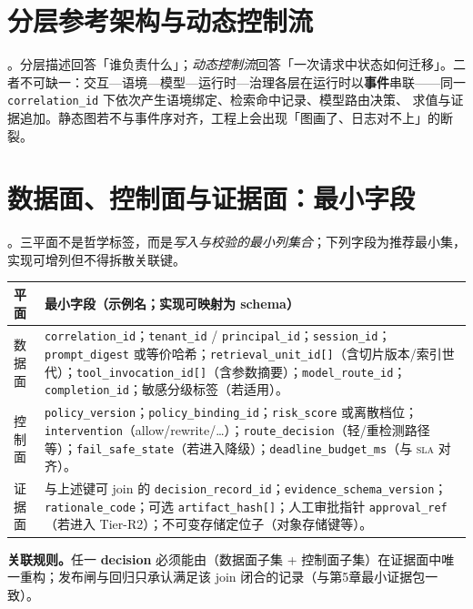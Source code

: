 \documentclass[11pt,a4paper]{report}
\begin{document}
\section{分层参考架构与动态控制流}
\ControlPlane{}。分层描述回答「谁负责什么」；\emph{动态控制流}回答「一次请求中状态如何迁移」。二者不可缺一：交互—语境—模型—运行时—治理各层在运行时以\textbf{事件}串联——同一 \texttt{correlation\_id} 下依次产生语境绑定、检索命中记录、模型路由决策、\SafetyKernel{} 求值与证据追加。静态图若不与事件序对齐，工程上会出现「图画了、日志对不上」的断裂。

\section{数据面、控制面与证据面：最小字段}
\ControlPlane{}。三平面不是哲学标签，而是\emph{写入与校验的最小列集合}；下列字段为推荐最小集，实现可增列但不得拆散关联键。

\begin{center}
\footnotesize
\begin{tabular}{@{}p{}p{}@{}}
\toprule
\textbf{平面} & \textbf{最小字段（示例名；实现可映射为 schema）} \\
\midrule
数据面 & \texttt{correlation\_id}；\texttt{tenant\_id} / \texttt{principal\_id}；\texttt{session\_id}；\texttt{prompt\_digest} 或等价哈希；\texttt{retrieval\_unit\_id[]}（含切片版本/索引世代）；\texttt{tool\_invocation\_id[]}（含参数摘要）；\texttt{model\_route\_id}；\texttt{completion\_id}；敏感分级标签（若适用）。 \\
控制面 & \texttt{policy\_version}；\texttt{policy\_binding\_id}；\texttt{risk\_score} 或离散档位；\texttt{intervention}（allow/rewrite/\ldots）；\texttt{route\_decision}（轻/重检测路径等）；\texttt{fail\_safe\_state}（若进入降级）；\texttt{deadline\_budget\_ms}（与 \textsc{sla} 对齐）。 \\
证据面 & 与上述键可 join 的 \texttt{decision\_record\_id}；\texttt{evidence\_schema\_version}；\texttt{rationale\_code}；可选 \texttt{artifact\_hash[]}；人工审批指针 \texttt{approval\_ref}（若进入 Tier-R2）；不可变存储定位子（对象存储键等）。 \\
\bottomrule
\end{tabular}
\end{center}

\noindent\textbf{关联规则。}任一 \textbf{decision} 必须能由（数据面子集 + 控制面子集）在证据面中唯一重构；发布闸与回归只承认满足该 join 闭合的记录（与第5章最小证据包一致）。
\end{document}
